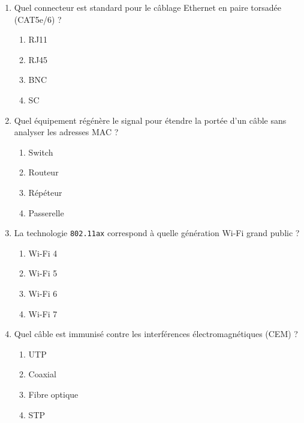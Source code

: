 \documentclass[11pt]{article}
\begin{document}
\begin{exercice}
\begin{enumerate}
    \item Quel connecteur est standard pour le câblage Ethernet en paire torsadée (CAT5e/6) ?
    \begin{enumerate}
        \item RJ11 \item RJ45 \item BNC \item SC
    \end{enumerate}
    \item Quel équipement régénère le signal pour étendre la portée d'un câble sans analyser les adresses MAC ?
    \begin{enumerate}
        \item Switch \item Routeur \item Répéteur \item Passerelle
    \end{enumerate}
    \item La technologie \texttt{802.11ax} correspond à quelle génération Wi-Fi grand public ?
    \begin{enumerate}
        \item Wi-Fi 4 \item Wi-Fi 5 \item Wi-Fi 6 \item Wi-Fi 7
    \end{enumerate}
    \item Quel câble est immunisé contre les interférences électromagnétiques (CEM) ?
    \begin{enumerate}
        \item UTP \item Coaxial \item Fibre optique \item STP
    \end{enumerate}
\end{enumerate}
\end{exercice}
\end{document}
